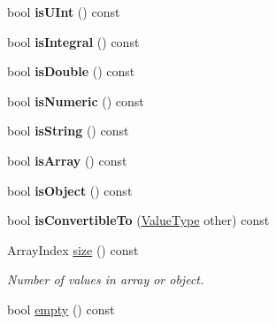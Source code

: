 \begin{DoxyCompactItemize}
\item 
\hypertarget{class_json_1_1_value_ae814ca1796fe2d43ac09898b70213989}{bool {\bfseries is\-U\-Int} () const }\label{class_json_1_1_value_ae814ca1796fe2d43ac09898b70213989}

\item 
\hypertarget{class_json_1_1_value_aec4f74ef7b776b1d9c8a10fc3bb4add5}{bool {\bfseries is\-Integral} () const }\label{class_json_1_1_value_aec4f74ef7b776b1d9c8a10fc3bb4add5}

\item 
\hypertarget{class_json_1_1_value_a0ea567fa51fc808851698bef59b43626}{bool {\bfseries is\-Double} () const }\label{class_json_1_1_value_a0ea567fa51fc808851698bef59b43626}

\item 
\hypertarget{class_json_1_1_value_a8ce848900e2e8fa23a41fcc2c1409fab}{bool {\bfseries is\-Numeric} () const }\label{class_json_1_1_value_a8ce848900e2e8fa23a41fcc2c1409fab}

\item 
\hypertarget{class_json_1_1_value_a06c01d7c1e8151a5844b595ab00f46c7}{bool {\bfseries is\-String} () const }\label{class_json_1_1_value_a06c01d7c1e8151a5844b595ab00f46c7}

\item 
\hypertarget{class_json_1_1_value_ac8c898f93543e55b67418f94bced20af}{bool {\bfseries is\-Array} () const }\label{class_json_1_1_value_ac8c898f93543e55b67418f94bced20af}

\item 
\hypertarget{class_json_1_1_value_a80cffaa0402b80317c0437216bbb6d92}{bool {\bfseries is\-Object} () const }\label{class_json_1_1_value_a80cffaa0402b80317c0437216bbb6d92}

\item 
\hypertarget{class_json_1_1_value_a7ec153803631a27abf58cba2bb1af70c}{bool {\bfseries is\-Convertible\-To} (\hyperlink{namespace_json_a7d654b75c16a57007925868e38212b4e}{Value\-Type} other) const }\label{class_json_1_1_value_a7ec153803631a27abf58cba2bb1af70c}

\item 
\hypertarget{class_json_1_1_value_a4ca8ee6c48a34ca6c2f131956bab5e05}{Array\-Index \hyperlink{class_json_1_1_value_a4ca8ee6c48a34ca6c2f131956bab5e05}{size} () const }\label{class_json_1_1_value_a4ca8ee6c48a34ca6c2f131956bab5e05}

\begin{DoxyCompactList}\small\item\em Number of values in array or object. \end{DoxyCompactList}\item 
\hypertarget{class_json_1_1_value_a99c42d3ff8495dad1e91b43e66553c36}{bool \hyperlink{class_json_1_1_value_a99c42d3ff8495dad1e91b43e66553c36}{empty} () const }\label{class_json_1_1_value_a99c42d3ff8495dad1e91b43e66553c36}


\end{DoxyCompactItemize}

